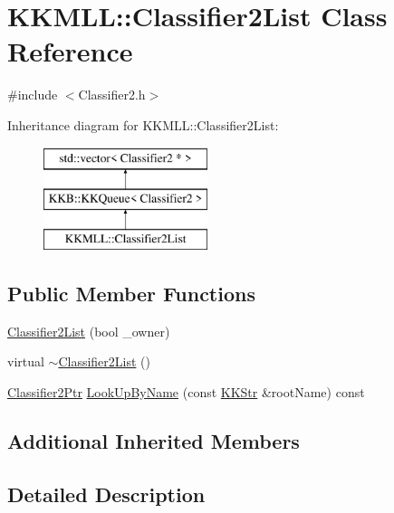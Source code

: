 \hypertarget{class_k_k_m_l_l_1_1_classifier2_list}{}\section{K\+K\+M\+LL\+:\+:Classifier2\+List Class Reference}
\label{class_k_k_m_l_l_1_1_classifier2_list}


{\ttfamily \#include $<$Classifier2.\+h$>$}

Inheritance diagram for K\+K\+M\+LL\+:\+:Classifier2\+List\+:\begin{figure}[H]
\begin{center}
\leavevmode
\includegraphics[height=3.000000cm]{class_k_k_m_l_l_1_1_classifier2_list}
\end{center}
\end{figure}
\subsection*{Public Member Functions}
\begin{DoxyCompactItemize}
\item 
\hyperlink{class_k_k_m_l_l_1_1_classifier2_list_ad0c172f339b3f4c32e10be8e6c031f90}{Classifier2\+List} (bool \+\_\+owner)
\item 
virtual \hyperlink{class_k_k_m_l_l_1_1_classifier2_list_a78e2f01d328808d34f05127531cbf892}{$\sim$\+Classifier2\+List} ()
\item 
\hyperlink{namespace_k_k_m_l_l_ae49327d641e08f01c40df84678fad11e}{Classifier2\+Ptr} \hyperlink{class_k_k_m_l_l_1_1_classifier2_list_a6522e3c2e74e548a8da1929780de8246}{Look\+Up\+By\+Name} (const \hyperlink{class_k_k_b_1_1_k_k_str}{K\+K\+Str} \&root\+Name) const 
\end{DoxyCompactItemize}
\subsection*{Additional Inherited Members}


\subsection{Detailed Description}


